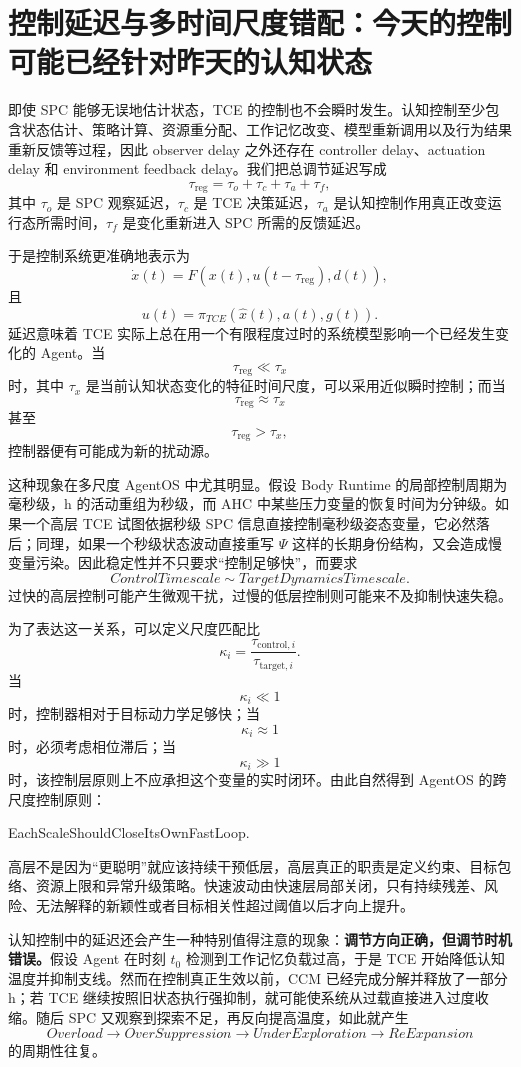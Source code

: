 \section{控制延迟与多时间尺度错配：今天的控制可能已经针对昨天的认知状态}

即使 SPC 能够无误地估计状态，TCE 的控制也不会瞬时发生。认知控制至少包含状态估计、策略计算、资源重分配、工作记忆改变、模型重新调用以及行为结果重新反馈等过程，因此 observer delay 之外还存在 controller delay、actuation delay 和 environment feedback delay。我们把总调节延迟写成
\[
\tau_{\mathrm{reg}}
=
\tau_o
+
\tau_c
+
\tau_a
+
\tau_f,
\]
其中 $\tau_o$ 是 SPC 观察延迟，$\tau_c$ 是 TCE 决策延迟，$\tau_a$ 是认知控制作用真正改变运行态所需时间，$\tau_f$ 是变化重新进入 SPC 所需的反馈延迟。

于是控制系统更准确地表示为
\[
\dot{x}(t)
=
F
\left(
x(t),
u(t-\tau_{\mathrm{reg}}),
d(t)
\right),
\]
且
\[
u(t)
=
\pi_{TCE}
\left(
\hat{x}(t),
a(t),
g(t)
\right).
\]
延迟意味着 TCE 实际上总在用一个有限程度过时的系统模型影响一个已经发生变化的 Agent。当
\[
\tau_{\mathrm{reg}}
\ll
\tau_x
\]
时，其中 $\tau_x$ 是当前认知状态变化的特征时间尺度，可以采用近似瞬时控制；而当
\[
\tau_{\mathrm{reg}}
\approx
\tau_x
\]
甚至
\[
\tau_{\mathrm{reg}}
>
\tau_x,
\]
控制器便有可能成为新的扰动源。

这种现象在多尺度 AgentOS 中尤其明显。假设 Body Runtime 的局部控制周期为毫秒级，h 的活动重组为秒级，而 AHC 中某些压力变量的恢复时间为分钟级。如果一个高层 TCE 试图依据秒级 SPC 信息直接控制毫秒级姿态变量，它必然落后；同理，如果一个秒级状态波动直接重写 $\Psi$ 这样的长期身份结构，又会造成慢变量污染。因此稳定性并不只要求“控制足够快”，而要求
\[
\boxed{
ControlTimescale
\sim
TargetDynamicsTimescale.
}
\]
过快的高层控制可能产生微观干扰，过慢的低层控制则可能来不及抑制快速失稳。

为了表达这一关系，可以定义尺度匹配比
\[
\kappa_i
=
\frac{\tau_{\mathrm{control},i}}
{\tau_{\mathrm{target},i}}.
\]
当
\[
\kappa_i\ll 1
\]
时，控制器相对于目标动力学足够快；当
\[
\kappa_i\approx 1
\]
时，必须考虑相位滞后；当
\[
\kappa_i\gg 1
\]
时，该控制层原则上不应承担这个变量的实时闭环。由此自然得到 AgentOS 的跨尺度控制原则：
\begin{statementbox}
EachScaleShouldCloseItsOwnFastLoop.
\end{statementbox}
高层不是因为“更聪明”就应该持续干预低层，高层真正的职责是定义约束、目标包络、资源上限和异常升级策略。快速波动由快速层局部关闭，只有持续残差、风险、无法解释的新颖性或者目标相关性超过阈值以后才向上提升。

认知控制中的延迟还会产生一种特别值得注意的现象：\textbf{调节方向正确，但调节时机错误。}假设 Agent 在时刻 $t_0$ 检测到工作记忆负载过高，于是 TCE 开始降低认知温度并抑制支线。然而在控制真正生效以前，CCM 已经完成分解并释放了一部分 h；若 TCE 继续按照旧状态执行强抑制，就可能使系统从过载直接进入过度收缩。随后 SPC 又观察到探索不足，再反向提高温度，如此就产生
\[
Overload
\rightarrow
OverSuppression
\rightarrow
UnderExploration
\rightarrow
ReExpansion
\]
的周期性往复。


